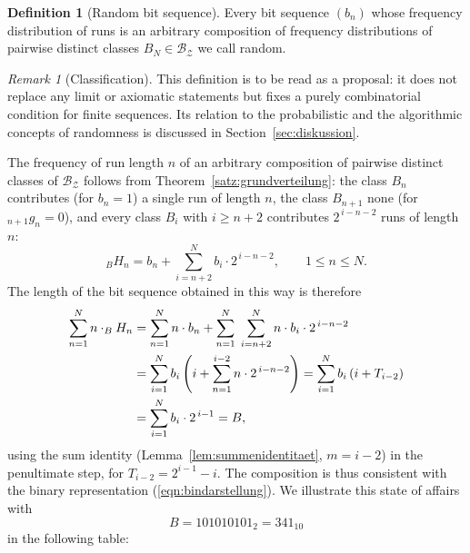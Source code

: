 \documentclass[11pt,a4paper]{scrartcl}
\theoremstyle{plain}
\theoremstyle{definition}
\newtheorem{defi}[satz]{Definition}
\theoremstyle{remark}
\newtheorem{bem}[satz]{Remark}
\begin{document}
\begin{defi}[Random bit sequence]\label{defi:zufaellig}
Every bit sequence $(b_n)$ whose frequency distribution of runs is an
arbitrary composition of frequency distributions of pairwise distinct
classes $B_N \in \mathcal{B_Z}$ we call random.
\end{defi}
\begin{bem}[Classification]\label{bem:einordnung}
This definition is to be read as a proposal: it does not replace any
limit or axiomatic statements but fixes a purely combinatorial
condition for finite sequences. Its relation to the probabilistic
and the algorithmic concepts of randomness is discussed in
Section~\ref{sec:diskussion}.
\end{bem}

The frequency of run length $n$ of an arbitrary composition of
pairwise distinct classes of $\mathcal{B_Z}$ follows from
Theorem~\ref{satz:grundverteilung}: the class $B_n$ contributes (for
$b_n=1$) a single run of length $n$, the class $B_{n+1}$ none (for
$_{n+1}g_n=0$), and every class $B_i$ with $i\geq n+2$ contributes
$2^{\,i-n-2}$ runs of length $n$:
\begin{equation}\label{eqn:hnformel}
  _BH_n=b_n+\sum_{i=n+2}^{N} b_{i}\cdot 2^{\,i-n-2},\qquad 1\leq n\leq N.
\end{equation}
The length of the bit sequence obtained in this way is therefore
\begin{align}
  \sum_{n=1}^{N} n\cdot _BH_n
  &= \sum_{n=1}^{N} n\cdot b_n+\sum_{n=1}^{N}\;\sum_{i=n+2}^{N}
     n\cdot b_{i}\cdot 2^{\,i-n-2}\notag\\
  &= \sum_{i=1}^{N} b_i\left(i+\sum_{n=1}^{i-2} n\cdot 2^{\,i-n-2}\right)
   = \sum_{i=1}^{N} b_i\left(i+T_{i-2}\right)\notag\\
  &= \sum_{i=1}^{N} b_i\cdot 2^{\,i-1}=B,\label{eqn:laengekonsistenz}
\end{align}
using the sum identity (Lemma~\ref{lem:summenidentitaet},
$m=i-2$) in the penultimate step, for $T_{i-2}=2^{i-1}-i$. The
composition is thus consistent with the binary representation
(\ref{eqn:bindarstellung}). We illustrate this state of affairs with
\begin{equation}
  B=101010101_2=341_{10}
\end{equation}
in the following table:
\end{document}
